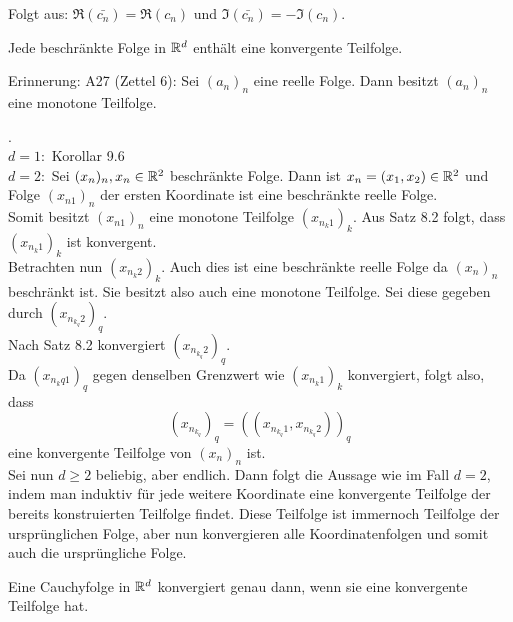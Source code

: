 \documentclass[../ana1.tex]{subfiles}
\begin{document}
\begin{bew}
	Folgt aus: \( \Re(\bar{c_n}) = \Re(c_n) \) und \( \Im(\bar{c_n}) = -\Im(c_n) \).
\end{bew}
\begin{satz}
	Jede beschränkte Folge in \(\mathbb{R}^d\) enthält eine konvergente Teilfolge.
\end{satz}
Erinnerung: A27 (Zettel 6): Sei \((a_n)_n\) eine reelle Folge. Dann besitzt \((a_n)_n\) eine monotone Teilfolge.
\begin{bew} .\\ %
	\(d=1: \) Korollar 9.6 \checkmark\\
	\(d=2: \) Sei \((x_n)_n, x_n\in\mathbb{R}^2\) beschränkte Folge. Dann ist \(x_n = (x_1,x_2)\in\mathbb{R}^2\) und Folge \((x_{n1})_n\) der ersten Koordinate ist eine beschränkte reelle Folge.\\
	Somit besitzt \( (x_{n1})_n \) eine monotone Teilfolge \( (x_{n_k 1})_k \). Aus Satz 8.2 folgt, dass \( (x_{n_k 1})_k \) ist konvergent.\\
	Betrachten nun \( (x_{n_k 2})_k \). Auch dies ist eine beschränkte reelle Folge da \((x_n)_n\) beschränkt ist. Sie besitzt also auch eine monotone Teilfolge. Sei diese gegeben durch \( (x_{n_{k_q}2})_q \).\\
	Nach Satz 8.2 konvergiert \((x_{n_{k_q}2})_q\).\\
	Da \((x_{n_k{q}1})_q\) gegen denselben Grenzwert wie \( (x_{n_k 1})_k \) konvergiert, folgt also, dass
	\[ (x_{n_{k_q}})_q = ((x_{n_{k_q}1}, x_{n_{k_q}2}))_q \]
	eine konvergente Teilfolge von \((x_n)_n\) ist.\\
	Sei nun \( d\geq 2 \) beliebig, aber endlich. Dann folgt die Aussage wie im Fall \(d=2\), indem man induktiv für jede weitere Koordinate eine konvergente Teilfolge der bereits konstruierten Teilfolge findet. Diese Teilfolge ist immernoch Teilfolge der ursprünglichen Folge, aber nun konvergieren alle Koordinatenfolgen und somit auch die ursprüngliche Folge.
\end{bew}
\begin{lem}
	Eine Cauchyfolge in \(\mathbb{R}^d\) konvergiert genau dann, wenn sie eine konvergente Teilfolge hat.
\end{lem}
\end{document}
